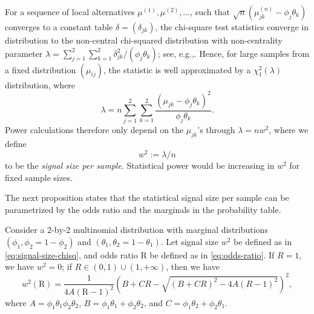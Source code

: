 For a sequence of local alternatives $\mu^{(1)}, \mu^{(2)}, \ldots$, such that $\sqrt{n}(\mu^{(n)}_{jk} - \phi_j\theta_k)$ converges to a constant table $\delta = (\delta_{jk})$, the chi-square test statistics converge in distribution to the non-central chi-squared distribution with non-centrality parameter 
$\lambda = \sum_{j=1}^2 \sum_{k=1}^2 {\delta_{jk}^2}/{(\phi_j\theta_k)}$; see, e.g.,\cite{ferguson2017course}.
Hence, for large samples from a fixed distribution $(\mu_{ij})$, the statistic is well approximated by a $\chi^2_1(\lambda)$ distribution, where
\begin{equation} 
\lambda = n\sum_{j=1}^2 \sum_{k=1}^2 \frac{(\mu_{jk} - \phi_j\theta_k)^2}{\phi_j\theta_k}.
\end{equation}
Power calculations therefore only depend on the $\mu_{jk}$'s through $\lambda=nw^2$, where we define 
\begin{equation} \label{eq:signal-size-chisq}
    w^2:=\lambda/n
\end{equation} 
to be the \emph{signal size per sample}. 
Statistical power would be increasing in $w^2$ for fixed sample sizes.

The next proposition states that the statistical signal size per sample can be parametrized by the odds ratio and the marginals in the probability table.

\begin{proposition} \label{prop:signal-size-odds-ratio}
Consider a 2-by-2 multinomial distribution with marginal distributions $(\phi_1, \phi_2 = 1-\phi_2)$ and $(\theta_1, \theta_2=1-\theta_1)$.
Let signal size $w^2$ be defined as in \eqref{eq:signal-size-chisq}, and odds ratio $\text{R}$ be defined as in \eqref{eq:odds-ratio}. 
If $R=1$, we have $w^2 = 0$; if $R\in(0,1)\cup(1,+\infty)$, then we have
\begin{equation} \label{eq:signal-size-odds-ratio}
    w^2(\text{R}) =
    \frac{1}{4A(\text{R}-1)^2}\left(B+CR-\sqrt{(B+CR)^2-4A(R-1)^2}\right)^2,
\end{equation}
where $A = \phi_1\theta_1\phi_2\theta_2$, $B = \phi_1\theta_1+\phi_2\theta_2$, and $C = \phi_1\theta_2+\phi_2\theta_1$.
\end{proposition}

